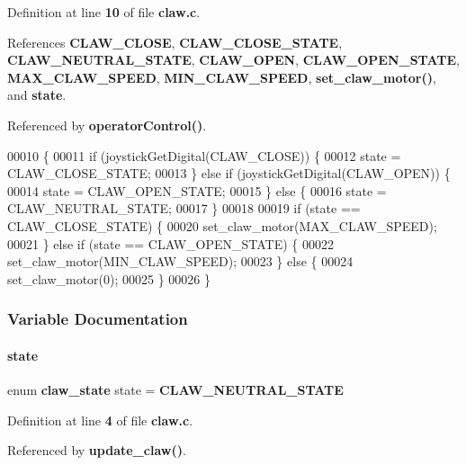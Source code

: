 Definition at line \textbf{ 10} of file \textbf{ claw.\+c}.



References \textbf{ C\+L\+A\+W\+\_\+\+C\+L\+O\+SE}, \textbf{ C\+L\+A\+W\+\_\+\+C\+L\+O\+S\+E\+\_\+\+S\+T\+A\+TE}, \textbf{ C\+L\+A\+W\+\_\+\+N\+E\+U\+T\+R\+A\+L\+\_\+\+S\+T\+A\+TE}, \textbf{ C\+L\+A\+W\+\_\+\+O\+P\+EN}, \textbf{ C\+L\+A\+W\+\_\+\+O\+P\+E\+N\+\_\+\+S\+T\+A\+TE}, \textbf{ M\+A\+X\+\_\+\+C\+L\+A\+W\+\_\+\+S\+P\+E\+ED}, \textbf{ M\+I\+N\+\_\+\+C\+L\+A\+W\+\_\+\+S\+P\+E\+ED}, \textbf{ set\+\_\+claw\+\_\+motor()}, and \textbf{ state}.



Referenced by \textbf{ operator\+Control()}.


\begin{DoxyCode}
00010                    \{
00011   \textcolor{keywordflow}{if} (joystickGetDigital(CLAW_CLOSE)) \{
00012     state = CLAW_CLOSE_STATE;
00013   \} \textcolor{keywordflow}{else} \textcolor{keywordflow}{if} (joystickGetDigital(CLAW_OPEN)) \{
00014     state = CLAW_OPEN_STATE;
00015   \} \textcolor{keywordflow}{else} \{
00016     state = CLAW_NEUTRAL_STATE;
00017   \}
00018 
00019   \textcolor{keywordflow}{if} (state == CLAW_CLOSE_STATE) \{
00020     set_claw_motor(MAX_CLAW_SPEED);
00021   \} \textcolor{keywordflow}{else} \textcolor{keywordflow}{if} (state == CLAW_OPEN_STATE) \{
00022     set_claw_motor(MIN_CLAW_SPEED);
00023   \} \textcolor{keywordflow}{else} \{
00024     set_claw_motor(0);
00025   \}
00026 \}
\end{DoxyCode}


\subsubsection{Variable Documentation}
\mbox{\label{a00086_a70d16bb05218682b0a5eaabb141e9d8f}} 
\paragraph{state}
{\footnotesize\ttfamily enum \textbf{ claw\+\_\+state} state = \textbf{ C\+L\+A\+W\+\_\+\+N\+E\+U\+T\+R\+A\+L\+\_\+\+S\+T\+A\+TE}\hspace{0.3cm}{\ttfamily [static]}}



Definition at line \textbf{ 4} of file \textbf{ claw.\+c}.



Referenced by \textbf{ update\+\_\+claw()}.

